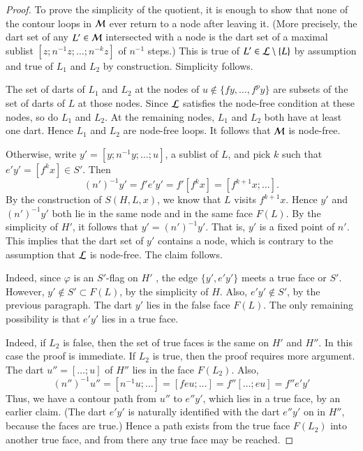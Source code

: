 \begin{proof}
 To prove the simplicity of the quotient, it is enough to show that
none of the contour
loops in ${\cal M}$  ever return to a node after leaving it.
 (More precisely, the dart set of any $L'\in{\cal M}$ intersected with a node
is the dart set of a maximal sublist $[z;n^{-1}z;\ldots;n^{-k}z]$ of $n^{-1}$ steps.)
This is true of $L'\in{\cal L}\setminus\{L\}$ by assumption and true of
$L_1$ and $L_2$ by construction.  Simplicity follows.

 The set of darts of $L_1$ and $L_2$ at the nodes of $u\not\in
\{f y,\ldots,f^p y\}$
are subsets of the set of darts of $L$ at those nodes.  Since ${\cal L}$ satisfies
the node-free condition at these nodes, so do $L_1$ and $L_2$.  
At the remaining nodes, $L_1$ and $L_2$ both have at least one dart.  Hence
$L_1$ and $L_2$ are node-free loops.  It follows that ${\cal M}$ is node-free.

Otherwise, write $y' = [y;n^{-1}y;\ldots;u]$, a sublist of $L$, and
pick $k$ such that $e'y' = [f^k x]\in S'$.  Then
\begin{displaymath}
(n')^{-1} y' = f'e'y' = f'[f^k x] = [f^{k+1}x;\ldots].
\end{displaymath}
By the construction of $S(H,L,x)$, we know that $L$ visits $f^{k+1}x$.
Hence $y'$ and $(n')^{-1}y'$ both lie in the same node and in the same
face $F(L)$.  By the simplicity of $H'$, it follows that $y' =
(n')^{-1} y'$.  That is, $y'$ is a fixed point of $n'$.  This implies
that the dart set of $y'$ contains a node, which is contrary to the
assumption that ${\cal L}$ is node-free.  The claim follows.


  Indeed,
 since $\varphi$ is
an $S'$-flag on $H'$ , the edge $\{y',e'y'\}$ meets a true face or
$S'$.  However, $y'\not\in S'\subset F(L)$, by the simplicity of $H$.  Also,
$e'y'\not\in S'$, by the previous paragraph.
The dart $y'$ lies in the false face $F(L)$.  The only
remaining possibility is that $e'y'$ lies in a true face.  



   Indeed, if $L_2$ is false, then the set of true faces
is the same on $H'$ and $H''$.  In this case the proof
is immediate.  If $L_2$ is true, then the proof requires more
argument.  
The dart $u''=[\ldots;u]$ of $H''$ lies in the face $F(L_2)$.
Also, 
\begin{displaymath}
(n'')^{-1} u''= [n^{-1} u;\ldots] = [f e u;\ldots] = f'' [\ldots; e u]
  = f'' e' y'
\end{displaymath}
Thus, we have a contour path from $u''$ to $e'' y'$, which lies in a
true face, by an earlier claim.  (The dart $e'y'$ is naturally
identified with the dart $e'' y'$ on in $H''$, because the faces are
true.)  Hence a path exists from the true face $F(L_2)$ into another
true face, and from there any true face may be reached.


\end{proof}
